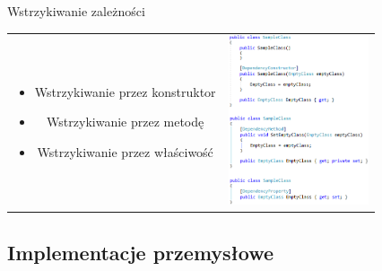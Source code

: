 \documentclass{beamer}
\begin{document}
\begin{frame}{Wstrzykiwanie zależności}
\begin{table}
     \begin{small}
	\begin{tabular}{ c p{3cm} }
	
	\begin{minipage}{.6\textwidth}
\begin{itemize}
	\item Wstrzykiwanie przez konstruktor
	\item Wstrzykiwanie przez metodę
	\item Wstrzykiwanie przez właściwość
\end{itemize}
   	 \end{minipage}
   	 &   	 
	\begin{minipage}{.4\textwidth}	
  		\includegraphics[height=5cm]{PresentationDependency.png}
   	 \end{minipage}

	\end{tabular}
     \end{small}
\end{table}
\end{frame}

\subsection*{Implementacje przemysłowe}
\end{document}
